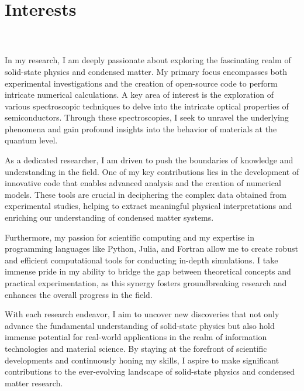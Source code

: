 \documentclass[letterpaper,dvipsnames]{twentysecondcv} %
\begin{document}
\newpage
\makeprofile 
\section{Interests}
\\\\
In my research, I am deeply passionate about exploring the fascinating realm of solid-state physics and condensed matter. My primary focus encompasses both experimental investigations and the creation of open-source code to perform intricate numerical calculations. A key area of interest is the exploration of various spectroscopic techniques to delve into the intricate optical properties of semiconductors. Through these spectroscopies, I seek to unravel the underlying phenomena and gain profound insights into the behavior of materials at the quantum level.

As a dedicated researcher, I am driven to push the boundaries of knowledge and understanding in the field. One of my key contributions lies in the development of innovative code that enables advanced analysis and the creation of numerical models. These tools are crucial in deciphering the complex data obtained from experimental studies, helping to extract meaningful physical interpretations and enriching our understanding of condensed matter systems.

Furthermore, my passion for scientific computing and my expertise in programming languages like Python, Julia, and Fortran allow me to create robust and efficient computational tools for conducting in-depth simulations. I take immense pride in my ability to bridge the gap between theoretical concepts and practical experimentation, as this synergy fosters groundbreaking research and enhances the overall progress in the field.

With each research endeavor, I aim to uncover new discoveries that not only advance the fundamental understanding of solid-state physics but also hold immense potential for real-world applications in the realm of information technologies and material science. By staying at the forefront of scientific developments and continuously honing my skills, I aspire to make significant contributions to the ever-evolving landscape of solid-state physics and condensed matter research.
\end{document}
